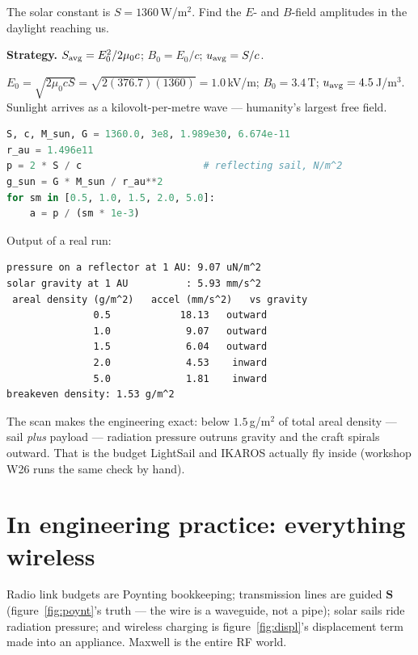 \begin{example}\label{ex:sun}
The solar constant is $S=1360$\,W/m$^{2}$. Find the $E$- and
$B$-field amplitudes in the daylight reaching us.
\par\smallskip
\textbf{Strategy.} $S_{\rm avg}=E_0^{2}/2\mu_0c$;
$B_0=E_0/c$; $u_{\rm avg}=S/c$.
\begin{solution}
$E_0=\sqrt{2\mu_0cS}=\sqrt{2(376.7)(1360)}=1.0$\,kV/m;
$B_0=3.4$\,\textmu T; $u_{\rm avg}=4.5$\,\textmu J/m$^{3}$.
Sunlight arrives as a kilovolt-per-metre wave --- humanity's largest
free field. \checkmark
\end{solution}
\end{example}

\begin{lstlisting}[language=Python,caption={\texttt{code/ch15\_sail.py} --- sail parameter scan: when does radiation pressure beat gravity?},label={lst:sail}]
S, c, M_sun, G = 1360.0, 3e8, 1.989e30, 6.674e-11
r_au = 1.496e11
p = 2 * S / c                     # reflecting sail, N/m^2
g_sun = G * M_sun / r_au**2
for sm in [0.5, 1.0, 1.5, 2.0, 5.0]:
    a = p / (sm * 1e-3)
\end{lstlisting}

Output of a real run:
\begin{lstlisting}[numbers=none]
pressure on a reflector at 1 AU: 9.07 uN/m^2
solar gravity at 1 AU          : 5.93 mm/s^2
 areal density (g/m^2)   accel (mm/s^2)   vs gravity
               0.5            18.13   outward
               1.0             9.07   outward
               1.5             6.04   outward
               2.0             4.53    inward
               5.0             1.81    inward
breakeven density: 1.53 g/m^2
\end{lstlisting}

The scan makes the engineering exact: below $1.5$\,g/m$^{2}$ of
total areal density --- sail \emph{plus} payload --- radiation
pressure outruns gravity and the craft spirals outward. That is the
budget LightSail and IKAROS actually fly inside (workshop W26 runs
the same check by hand).

\section{In engineering practice: everything wireless}\label{sec:max-eng}

Radio link budgets are Poynting bookkeeping; transmission lines are
guided $\mathbf S$ (figure~\ref{fig:poynt}'s truth --- the wire is a
waveguide, not a pipe); solar sails ride radiation pressure; and
wireless charging is figure~\ref{fig:displ}'s displacement term made
into an appliance. Maxwell is the entire RF world.

